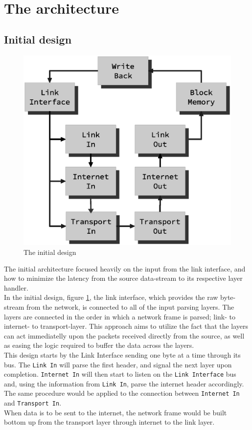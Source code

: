 \section{The architecture}
\subsection{Initial design}

\begin{figure}
    \includegraphics[scale=0.45]{design/design_0.eps}
    \caption{The initial design}
    \label{fig:initial_design}
\end{figure}

The initial architecture focused heavily on the input from the link interface, 
and how to minimize the latency from the source data-stream to its respective
layer handler.\\
In the initial design, figure \ref{fig:initial_design}, the link interface, which
provides the raw byte-stream from the network, is connected to all of the input
parsing layers. The layers are connected in the order in which a network frame 
is parsed; link- to internet- to transport-layer. This approach aims to utilize
the fact that the layers can act immediatelly upon the packets received directly
from the source, as well as easing the logic required to buffer the data across
the layers.\\
This design starts by the Link Interface sending one byte at a time through its bus. 
The \texttt{Link In} will parse the first header, and signal the next layer upon completion.
\texttt{Internet In} will then start to listen on the \texttt{Link Interface} bus
and, using the information from \texttt{Link In}, parse the internet header 
accordingly. The same procedure would be applied to the connection between 
\texttt{Internet In} and \texttt{Transport In}.\\
When data is to be sent to the internet, the network frame would be built bottom
up from the transport layer through internet to the link layer.

